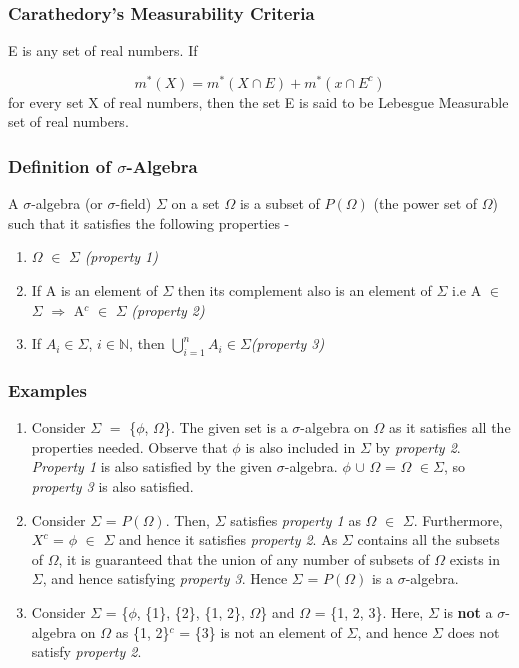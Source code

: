 \documentclass{article}
\begin{document}
\subsubsection{Carathedory's Measurability Criteria}

E is any set of real numbers. If

$$m^*(X)= m^*(X \cap E) + m^*(x \cap E^c) $$
for every set X of real numbers, then the set E is said to be Lebesgue Measurable set of real numbers.

\subsubsection{Definition of $\sigma$-Algebra}
A $\sigma$-algebra (or $\sigma$-field) $\Sigma$ on a set $\Omega$ is a subset of $P(\Omega)$ (the power set of $\Omega$) such that it satisfies the following properties -


\begin{enumerate}
	\item $\Omega$ $\in$ $\Sigma$ \textit{(property 1)}
	\item If A is an element of $\Sigma$ then its complement also is an element of $\Sigma$ i.e A $\in$ $\Sigma$ $\Rightarrow$ A$^c$ $\in$ $\Sigma$ \textit{(\textit{property 2})}
	\item If $A_i \in \Sigma$, 
	$i\in \mathbb{N}$, then $\bigcup\limits_{i=1}^{n}A_i \in \Sigma$\textit{(\textit{property 3})}
\end{enumerate}



\subsubsection{Examples}
\begin{enumerate}
	\item Consider $\Sigma$ $=$ \{$\phi$, $\Omega$\}. The given set is a $\sigma$-algebra on $\Omega$ as it satisfies all the properties needed. Observe that $\phi$ is also included in $\Sigma$ by \textit{property 2}. \textit{Property 1} is also satisfied by the given $\sigma$-algebra. $\phi $ $\cup$ $\Omega$ = $\Omega$ $\in \Sigma$, so \textit{property 3} is also satisfied.
	\item Consider $\Sigma$ = $P(\Omega)$. Then, $\Sigma$ satisfies \textit{property 1} as $\Omega$ $\in$ $\Sigma$. Furthermore, $X^c$ = $\phi$ $\in$ $\Sigma$ and hence it satisfies \textit{property 2}. As $\Sigma$ contains all the subsets of $\Omega$, it is guaranteed that the union of any number of subsets of $\Omega$ exists in $\Sigma$, and hence satisfying \textit{property 3}. Hence $\Sigma$ = $P(\Omega)$ is a $\sigma$-algebra. 
	\item Consider $\Sigma$ = \{$\phi$, \{1\}, \{2\}, \{1, 2\}, $\Omega$\} and $\Omega$ = \{1, 2, 3\}. Here, $\Sigma$ is \textbf{not} a $\sigma$-algebra on $\Omega$ as \{1, 2\}$^c$ = \{3\} is not an element of $\Sigma$, and hence $\Sigma$ does not satisfy \textit{property 2}.
\end{enumerate}
\end{document}
